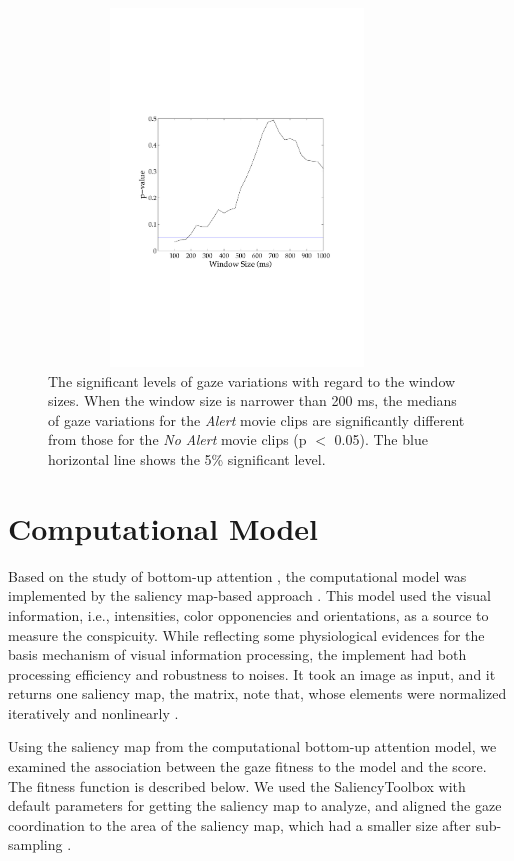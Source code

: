 \documentclass[oneside,master]{snueethesis}
\begin{document}
\begin{figure}
  \centerline{\includegraphics[width=100mm,height=95mm,trim=28mm 75mm 28mm 76mm]{./eps/gaze_var.pdf}}
  \caption[The significant levels of gaze variations with regard to the window sizes]{The significant levels of gaze variations with regard to the window sizes. When the window size is narrower than 200 ms, the medians of gaze variations for the \textit{Alert} movie clips are significantly different from those for the \textit{No Alert} movie clips (p $<$ 0.05). The blue horizontal line shows the 5\% significant level.}
  \label{fig:gaze-variation}
\end{figure}


\section{Computational Model}

Based on the study of bottom-up attention \cite{koch1985shifts}, the computational model was implemented by the saliency map-based approach \cite{itti1998model}. This model used the visual information, i.e., intensities, color opponencies and orientations, as a source to measure the conspicuity. While reflecting some physiological evidences for the basis mechanism of visual information processing, the implement had both processing efficiency and robustness to noises. It took an image as input, and it returns one saliency map, the matrix, note that, whose elements were normalized iteratively and nonlinearly \cite{itti2000saliency}.

Using the saliency map from the computational bottom-up attention model, we examined the association between the gaze fitness to the model and the score. The fitness function is described below. We used the SaliencyToolbox with default parameters for getting the saliency map to analyze, and aligned the gaze coordination to the area of the saliency map, which had a smaller size after sub-sampling \cite{Walther2006}.
\end{document}
